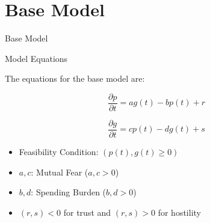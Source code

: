 \documentclass[11pt]{beamer}
\begin{document}
\section{Base Model}
\begin{frame}{Base Model}
    \begin{block}{Model Equations}
        
        The equations for the base model are:

    \begin{equation}
\dfrac{\partial p}{\partial t} = a g(t) - b p(t) + r
\end{equation}

\begin{equation}
\dfrac{\partial g}{\partial t} = c p(t) - d g(t) + s
\end{equation}
    \end{block}
    \begin{itemize}
        \item Feasibility Condition: \((p(t),g(t) \ge 0)\)
        \item \(a,c\): Mutual Fear (\(a,c>0\))
        \item \(b,d\): Spending Burden (\(b,d>0\))
        \item \((r,s)<0\) for trust and \((r,s)>0\) for hostility
    \end{itemize}








    
    \end{frame}
\end{document}
